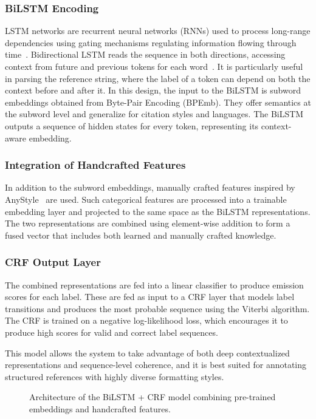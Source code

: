 \subsubsection{BiLSTM Encoding}
LSTM networks are recurrent neural networks (RNNs) used to process long-range dependencies using gating mechanisms regulating information flowing through time~\cite{lstm}. Bidirectional LSTM reads the sequence in both directions, accessing context from future and previous tokens for each word~\cite{bilstm}. It is particularly useful in parsing the reference string, where the label of a token can depend on both the context before and after it.
In this design, the input to the BiLSTM is subword embeddings obtained from Byte-Pair Encoding (BPEmb). They offer semantics at the subword level and generalize for citation styles and languages. The BiLSTM outputs a sequence of hidden states for every token, representing its context-aware embedding.

\subsubsection{Integration of Handcrafted Features}
In addition to the subword embeddings, manually crafted features inspired by AnyStyle~\cite{anystyle} are used. Such categorical features are processed into a trainable embedding layer and projected to the same space as the BiLSTM representations. The two representations are combined using element-wise addition to form a fused vector that includes both learned and manually crafted knowledge.

\subsubsection{CRF Output Layer}
The combined representations are fed into a linear classifier to produce emission scores for each label. These are fed as input to a CRF layer that models label transitions and produces the most probable sequence using the Viterbi algorithm. The CRF is trained on a negative log-likelihood loss, which encourages it to produce high scores for valid and correct label sequences.

This model allows the system to take advantage of both deep contextualized representations and sequence-level coherence, and it is best suited for annotating structured references with highly diverse formatting styles.

\begin{figure}[ht]
    \centering
    
    \caption{Architecture of the BiLSTM + CRF model combining pre-trained embeddings and handcrafted features.}
    \label{fig:bilstm-crf-architecture}
\end{figure}